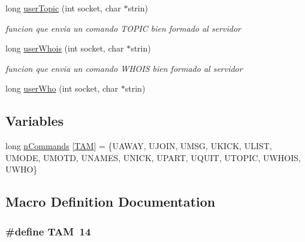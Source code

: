 \begin{DoxyCompactItemize}
long \hyperlink{_g-2301-05-_p2-user_commands_8c_ab94f0c41cd0db8a444f83be537a25a27}{user\-Topic} (int socket, char $\ast$strin)
\begin{DoxyCompactList}\small\item\em funcion que envia un comando T\-O\-P\-I\-C bien formado al servidor \end{DoxyCompactList}\item 
long \hyperlink{_g-2301-05-_p2-user_commands_8c_aa09b497c8e02a85ce7b5c55847ea0e6e}{user\-Whois} (int socket, char $\ast$strin)
\begin{DoxyCompactList}\small\item\em funcion que envia un comando W\-H\-O\-I\-S bien formado al servidor \end{DoxyCompactList}\item 
long \hyperlink{_g-2301-05-_p2-user_commands_8c_a3f3e5e80766b57227cb712a5746238a8}{user\-Who} (int socket, char $\ast$strin)
\end{DoxyCompactItemize}
\subsection*{Variables}
\begin{DoxyCompactItemize}
\item 
long \hyperlink{_g-2301-05-_p2-user_commands_8c_aef124ac385578c5a6c3308a917fee8ad}{n\-Commands} \mbox{[}\hyperlink{_g-2301-05-_p2-user_commands_8c_ae0b4816fb45161ef9da5e6d6134ee28a}{T\-A\-M}\mbox{]} = \{U\-A\-W\-A\-Y, U\-J\-O\-I\-N, U\-M\-S\-G, U\-K\-I\-C\-K, U\-L\-I\-S\-T, U\-M\-O\-D\-E, U\-M\-O\-T\-D, U\-N\-A\-M\-E\-S, U\-N\-I\-C\-K, U\-P\-A\-R\-T, U\-Q\-U\-I\-T, U\-T\-O\-P\-I\-C, U\-W\-H\-O\-I\-S, U\-W\-H\-O\}
\end{DoxyCompactItemize}


\subsection{Macro Definition Documentation}
\hypertarget{_g-2301-05-_p2-user_commands_8c_ae0b4816fb45161ef9da5e6d6134ee28a}{
\subsubsection[{T\-A\-M}]{\setlength{\rightskip}{0pt plus 5cm}\#define T\-A\-M~14}}\label{_g-2301-05-_p2-user_commands_8c_ae0b4816fb45161ef9da5e6d6134ee28a}


